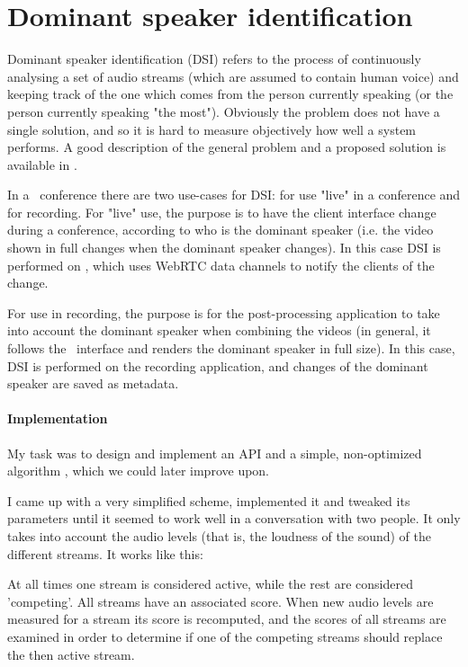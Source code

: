 \documentclass[twoside,openright,a4paper,12pt,english]{article}
\begin{document}
\section{Dominant speaker identification}
\label{dsd}
Dominant speaker identification (DSI) refers to the process of continuously analysing a set of audio streams
(which are assumed to contain human voice) and keeping track of the one which
comes from the person currently speaking (or the person currently speaking "the
most"). Obviously the problem does not have a single solution, and so it is hard
to measure objectively how well a system performs. A good description of the
general problem and a proposed solution is available in \cite{volfin2012}. 

In a \jm\ conference there are two use-cases for DSI: for use "live" in a
conference and for recording. 
For "live" use, the purpose is to have the client interface change during a
conference, according to who is the dominant speaker (i.e. the video shown in
full changes when the dominant speaker changes). In this case DSI is performed
on \jvb, which uses WebRTC data channels to notify the clients of the change.

For use in recording, the purpose is for the post-processing application to
take into account the dominant speaker when combining the videos (in general,
it follows the \jm\ interface and renders the dominant speaker in full size).
In this case, DSI is performed on the recording application, and changes of
the dominant speaker are saved as metadata.

\paragraph*{Implementation}
My task was to design and implement an API and a simple, non-optimized
algorithm , which we could later improve upon. 

I came up with a very simplified scheme, implemented it and tweaked its parameters until it seemed to
work well in a conversation with two people. It only takes into account the
audio levels (that is, the loudness of the sound) of the different streams. It
works like this:

At all times one stream is considered active, while the rest are considered
'competing'. All streams have an associated score. When new audio levels are
measured for a stream its score is recomputed,
and the scores of all streams are examined in order to determine if one of
the competing streams should replace the then active stream.
\end{document}
